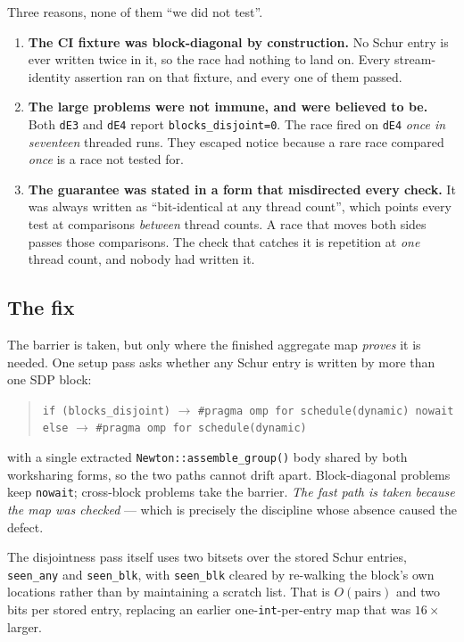 \documentclass[11pt]{article}
\newcommand{\code}[1]{\texttt{#1}}
\begin{document}
Three reasons, none of them ``we did not test''.

\begin{enumerate}
\item \textbf{The CI fixture was block-diagonal by construction.} No Schur entry is ever written
      twice in it, so the race had nothing to land on. Every stream-identity assertion ran on that
      fixture, and every one of them passed.
\item \textbf{The large problems were not immune, and were believed to be.} Both \code{dE3} and
      \code{dE4} report \code{blocks\_disjoint=0}. The race fired on \code{dE4} \emph{once in
      seventeen} threaded runs. They escaped notice because a rare race compared \emph{once} is a
      race not tested for.
\item \textbf{The guarantee was stated in a form that misdirected every check.} It was always
      written as ``bit-identical at any thread count'', which points every test at comparisons
      \emph{between} thread counts. A race that moves both sides passes those comparisons. The
      check that catches it is repetition at \emph{one} thread count, and nobody had written it.
\end{enumerate}

\subsection{The fix}

The barrier is taken, but only where the finished aggregate map \emph{proves} it is needed. One
setup pass asks whether any Schur entry is written by more than one SDP block:

\begin{quote}
\code{if (blocks\_disjoint)} $\rightarrow$ \code{\#pragma omp for schedule(dynamic) nowait} \\
\code{else} $\rightarrow$ \code{\#pragma omp for schedule(dynamic)}
\end{quote}

with a single extracted \code{Newton::assemble\_group()} body shared by both worksharing forms, so
the two paths cannot drift apart. Block-diagonal problems keep \code{nowait}; cross-block problems
take the barrier. \emph{The fast path is taken because the map was checked} --- which is precisely
the discipline whose absence caused the defect.

The disjointness pass itself uses two bitsets over the stored Schur entries, \code{seen\_any} and
\code{seen\_blk}, with \code{seen\_blk} cleared by re-walking the block's own locations rather than
by maintaining a scratch list. That is $O(\text{pairs})$ and two bits per stored entry, replacing
an earlier one-\code{int}-per-entry map that was $16\times$ larger.
\end{document}
